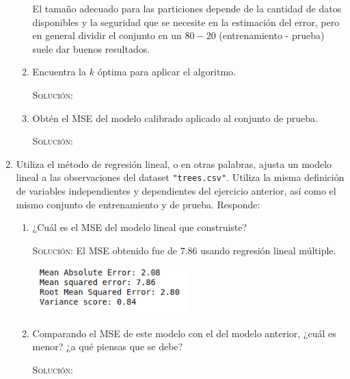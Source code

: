 \documentclass[letterpaper,11pt]{article}
\begin{document}
\begin{enumerate}
\begin{enumerate}
        El tamaño adecuado para las particiones depende de la cantidad de 
        datos disponibles y la seguridad que se necesite en la estimación 
        del error, pero en general dividir el conjunto en un $80-20$ 
        (entrenamiento - prueba) suele dar buenos resultados.

        \item Encuentra la $k$ óptima para aplicar el algoritmo.
        
        \textsc{Solución:}

        \item Obtén el MSE del modelo calibrado aplicado al conjunto de prueba.
        
        \textsc{Solución:}
    \end{enumerate}

    \item Utiliza el método de regresión lineal, o en otras palabras, ajusta 
    un modelo lineal a las observaciones del dataset \texttt{"trees.csv"}. 
    Utiliza la misma definición de variables independientes y dependientes del 
    ejercicio anterior, así como el mismo conjunto de entrenamiento y de prueba.
    Responde:
    \begin{enumerate}
        \item ¿Cuál es el MSE del modelo lineal que construiste?
        
        \textsc{Solución:} El MSE obtenido fue de $7.86$ usando regresión 
        lineal múltiple.

        \begin{center}
            \includegraphics[width=0.5\textwidth]{./imagenes/MSE_Lineal.png}
        \end{center}

        \item Comparando el MSE de este modelo con el del modelo anterior, 
        ¿cuál es menor? ¿a qué piensas que se debe?

        \textsc{Solución:}

    \end{enumerate}
\end{enumerate}
\end{document}
